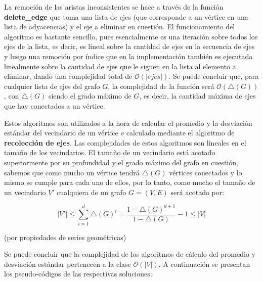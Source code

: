 La remoción de las aristas inconsistentes se hace a través de la función \textbf{delete_edge} que toma una lista de ejes (que corresponde a un vértice en una lista de adyacencias) y el eje a eliminar en cuestión. El funcionamiento del algoritmo es bastante sencillo, pues esencialmente es una iteración sobre todos los ejes de la lista, es decir, es lineal sobre la cantidad de ejes en la secuencia de ejes y luego una remoción por índice que en la implementación también es ejecutada linealmente sobre la cantidad de ejes que le siguen en la lista al elemento a eliminar, dando una complejidad total de $\mathcal{O}(|ejes|)$. Se puede concluir que, para cualquier lista de ejes del grafo $G$, la complejidad de la función será $\mathcal{O}(\triangle(G))$, con $\triangle(G)$ siendo el grado máximo de $G$, es decir, la cantidad máxima de ejes que hay conectados a un vértice.



Estos algoritmos son utilizados a la hora de calcular el promedio y la desviación estándar del vecindario de un vértice $v$ calculado mediante el algoritmo de \textbf{recolección de ejes}. Las complejidades de estos algoritmos son lineales en el tamaño de los vecindarios. El tamaño de un vecindario está acotado superiormente por su profundidad y el grado máximo del grafo en cuestión, sabemos que como mucho un vértice tendrá $\triangle(G)$ vértices conectados y lo mismo se cumple para cada uno de ellos, por lo tanto, como mucho el tamaño de un vecindario $V'$ cualquiera de un grafo $G=(V, E)$ será acotado por:

\vskip 8pt

$$|V'| \leq \sum_{i=1}^{d}\triangle(G)^i = \frac{1-\triangle(G)^{d+1}}{1-\triangle(G)}-1 \leq |V|$$
\begin{center}
(por propiedades de series geométricas)
\end{center}

\vskip 8pt

Se puede concluir que la complejidad de los algoritmos de cálculo del promedio y desviación estándar pertenecen a la clase $\mathcal{O}(|V|)$. A continuación se presentan los pseudo-códigos de las respectivas soluciones:





